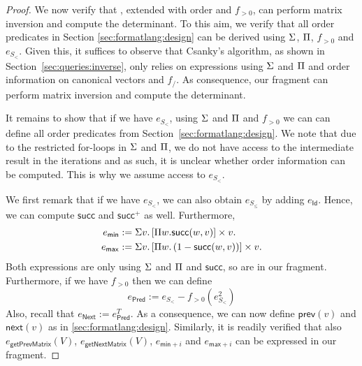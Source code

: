 %



\begin{proof}
We now verify that \langmprod, extended with order and $f_{>0}$, 
can perform matrix inversion and compute the determinant. 
To this aim, we verify that all order
predicates in Section \ref{sec:formatlang:design} can be derived using $\Sigma$, $\Pi$, $f_{>0}$ and 
$e_{S_{<}}$. Given this, it suffices to observe that Csanky's algorithm, as shown in Section~\ref{sec:queries:inverse}, only relies on expressions using $\Sigma$ and $\Pi$ and order information on canonical vectors and $f_/$.
As consequence, our fragment can perform matrix inversion and compute the determinant.


It remains to show that if we have $e_{S_{<}}$, using $\Sigma$ and $\Pi$ and $f_{>0}$ we can
can define all order predicates from Section~\ref{sec:formatlang:design}. We note that due to the restricted for-loops
in $\Sigma$ and $\Pi$, we do not have access to the intermediate
result in the iterations and as such, it is unclear whether order information can be computed. This is why
we assume access to $e_{S_<}$.

We first remark that if we have $e_{S_{<}}$, we can also obtain
 $e_{S_{\leq}}$ by adding $e_{\mathsf{Id}}$. Hence,
we can compute $\mathsf{succ}$ and $\mathsf{succ}^+$ as well. Furthermore, 
\begin{align*}
  e_{\mathsf{min}}&:=\Sigma v. \left[ \Pi w. \mathsf{succ}(w,v)\right] \times v. \\
  e_{\mathsf{max}}&:=\Sigma v. \left[ \Pi w. \left( 1-\mathsf{succ}(w,v) \right) \right] \times v.
\end{align*}
Both expressions are only using $\Sigma$ and $\Pi$ and $\mathsf{succ}$, so are in our fragment.
Furthermore, if we have $f_{>0}$ then we can define
$$
e_{\mathsf{Pred}}:= e_{S_{<}}- f_{>0}(e_{S_{<}}^2)
$$
Also, recall that  $e_{\mathsf{Next}}:=e_{\mathsf{Pred}}^T$. As a consequence, 
we can now define $\mathsf{prev}(v)$ and $\mathsf{next}(v)$ as in \ref{sec:formatlang:design}. Similarly,
it is readily verified that also $e_{\mathsf{getPrevMatrix}}(V)$,
$e_{\mathsf{getNextMatrix}}(V)$, $e_{\mathsf{min}+i}$ and $e_{\mathsf{max}+i}$ can be expressed
in our fragment.
\end{proof}
